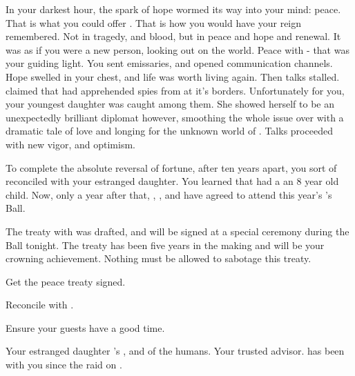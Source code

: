 \documentclass[char]{NeptuneBall}
\begin{document}
In your darkest hour, the spark of hope wormed its way into your mind: peace. That is what you could offer \pAtlantis{}. That is how you would have your reign remembered. Not in tragedy, and blood, but in peace and hope and renewal. It was as if you were a new person, looking out on the world. Peace with \pPacifica{} - that was your guiding light. You sent emissaries, and opened communication channels. Hope swelled in your chest, and life was worth living again. Then talks stalled. \pPacifica{} claimed that had apprehended spies from \pAtlantis{} at it's borders. Unfortunately for you, your youngest daughter \cDaughter{} was caught among them. She showed herself to be an unexpectedly brilliant diplomat however, smoothing the whole issue over with a dramatic tale of love and longing for the unknown world of \pPacifica{}. Talks proceeded with new vigor, and optimism.

To complete the absolute reversal of fortune, after ten years apart, you sort of reconciled with your estranged daughter.  You learned that \cAriel{} had a an 8 year old child. Now, only a year after that, \cAriel{\MYname{}}, \cAriel{\their{}} \cEric{\spouse}, and \cAriel{\their{}} \cAriel{\offspring{}} have agreed to attend this year's \cKing{}'s Ball. 

The treaty with \pPacifica{} was drafted, and will be signed at a special ceremony during the Ball tonight. The treaty has been five years in the making and will be your crowning achievement. Nothing must be allowed to sabotage this treaty.

\begin{itemz}[Goals]
  \item Get the peace treaty signed.
  \item Reconcile with \cAriel{\MYname{}}.
  \item Ensure your guests have a good time.
\end{itemz}

\begin{contacts}
  \contact{\cAriel{}} Your estranged daughter
  \contact{\cEric{}} \cAriel{}'s \cEric{\spouse{}}, and \cEric{\Prince} of the humans.
  \contact{\cManta{}} Your trusted advisor. \cManta{\They{}} has been with you since the raid on \pPacifica{}.
\end{contacts}
\end{document}
